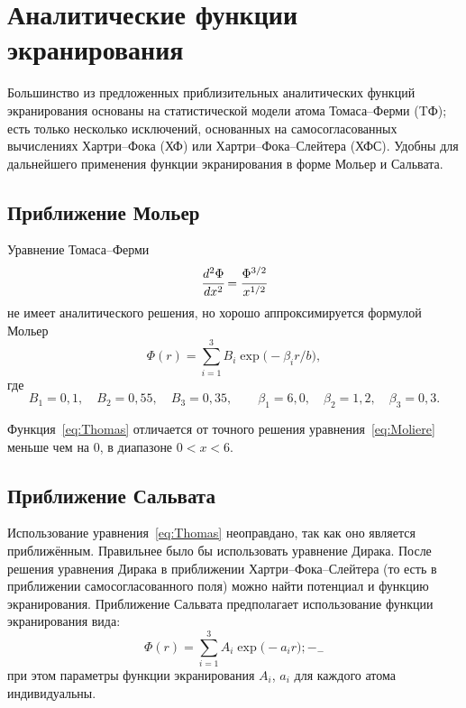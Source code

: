 \documentclass[10pt,pscyr]{hedlab}
\date{10.04.2014}
\newcommand{\eq}  [1]{\eqref{eq:#1}}
\begin{document}
  \makeheader
  
  \section{Аналитические функции экранирования}

  Большинство из предложенных приблизительных аналитических
  функций экранирования основаны на статистической модели
  атома Томаса--Ферми (TФ); есть только несколько исключений,
  основанных на самосогласованных вычислениях Хартри--Фока (ХФ)
  или Хартри--Фока--Слейтера (ХФС). Удобны для дальнейшего
  применения функции экранирования в форме Мольер и Сальвата.
  
  \subsection{Приближение Мольер}

  Уравнение Томаса--Ферми
  \begin{equation}
    \cfrac{d^2\Phi}{dx^2} = \cfrac{\Phi^{3/2}}{x^{1/2}}
    \label{eq:Thomas}
  \end{equation}
  не имеет аналитического  решения, но хорошо аппроксимируется
  формулой Мольер
  \begin{equation}
    \Phi(r)=\sum_{i=1}^3B_i\exp\bigl(-\beta_ir/b\big),
    \label{eq:Moliere}
  \end{equation}
  где
  \[
    B_1 = 0,\!1, \quad B_2 = 0,\!55, \quad B_3 = 0,\!35, \qquad
      \beta_1 = 6,\!0, \quad \beta_2 = 1,\!2, \quad \beta_3 = 0,\!3.
  \]
 
  Функция~\eq{Thomas} отличается от точного решения
  уравнения~\eq{Moliere} меньше чем на 0, в диапазоне
  \( 0 < x < 6 \).

  \subsection{Приближение Сальвата}

  Использование уравнения~\eq{Thomas} неоправдано, так как оно является
  приближённым. Правильнее было бы использовать уравнение Дирака.
  После решения уравнения Дирака в приближении Хартри--Фока--Слейтера
  (то есть в приближении самосогласованного поля) можно найти
  потенциал и функцию экранирования. Приближение Сальвата
  предполагает использование функции экранирования вида:
  \begin{equation}
    \Phi(r) = \sum_{i = 1}^3 A_i\exp\bigl(-a_ir\big);
    \label{eq:Salvat11} -_-
  \end{equation}
  при этом параметры функции экранирования \( A_i \), \( a_i \) для каждого
  атома индивидуальны. 
\end{document}
